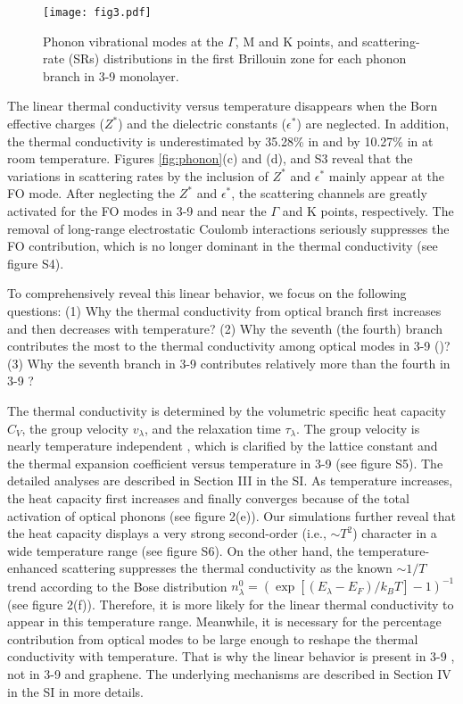 \documentclass[journal=jpclcd,manuscript=article, layout=twocolumn]{achemso}
\begin{document}
	
	\begin{figure*}[htbp]
		\centering 
		\texttt{[image: fig3.pdf]}
		\caption{Phonon vibrational modes at the $\Gamma$, M and K points, and  scattering-rate (SRs) distributions in the first Brillouin zone for each phonon branch in 3-9  monolayer.}
		\label{fig:vibration}
	\end{figure*}
	
    The linear thermal conductivity versus temperature disappears when the Born effective charges ($Z^*$) and the dielectric constants ($\epsilon^*$) are neglected. In addition, the thermal conductivity is underestimated by 35.28\% in  and by 10.27\% in  at room temperature. Figures \ref{fig:phonon}(c) and (d), and S3 reveal that the variations in scattering rates by the inclusion of $Z^*$ and $\epsilon^*$ mainly appear at the FO mode. After neglecting the $Z^*$ and $\epsilon^*$, the scattering channels are greatly activated for the FO modes in 3-9  and  near the $\Gamma$ and K points, respectively. The removal of long-range electrostatic Coulomb interactions seriously suppresses the FO contribution, which is no longer dominant in the thermal conductivity (see figure S4).
    
	
	To comprehensively reveal this linear behavior, we focus on the following questions: (1) Why the thermal conductivity from optical branch first increases and then decreases with temperature? (2) Why the seventh (the fourth) branch contributes the most to the thermal conductivity among optical modes in 3-9  ()? (3) Why the seventh branch in 3-9  contributes relatively more than the fourth in 3-9 ?

	The thermal conductivity is determined by the volumetric specific heat capacity $C_V$, the group velocity $v_\lambda$, and the relaxation time $\tau_\lambda$. 
	The group velocity is nearly temperature independent \cite{2017-PRB-GaN,2017-PRB-v}, which is clarified by the lattice constant and the thermal expansion coefficient versus temperature in 3-9  (see figure S5).
	The detailed analyses are described in Section III in the SI.
	As temperature increases, the heat capacity first increases and finally converges because of the total activation of optical phonons (see figure 2(e)). Our simulations further reveal that the heat capacity displays a very strong second-order (i.e., $\sim T^2$) character in a wide temperature range (see figure S6). On the other hand, the temperature-enhanced scattering suppresses the thermal conductivity as the known $\sim 1/T$ trend according to the Bose distribution $n^0_\lambda=(\exp{[(E_\lambda-E_F)/k_BT]}-1)^{-1}$ (see figure 2(f)). Therefore, it is more likely for the linear thermal conductivity to appear in this temperature range. Meanwhile, it is necessary for the percentage contribution from optical modes to be large enough to reshape the thermal conductivity with temperature. That is why the linear behavior is present in 3-9 , not in 3-9  and graphene. The underlying mechanisms are described in Section IV in the SI in more details.
\end{document}
